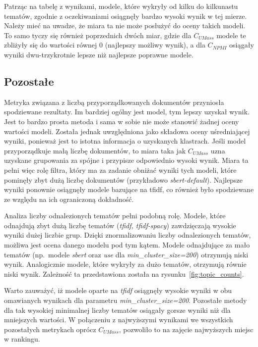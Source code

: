		Patrząc na tabelę z wynikami, modele, które wykryły od kilku do kilkunastu tematów, zgodnie z oczekiwaniami osiągnęły bardzo wysoki wynik w tej mierze.
		Należy mieć na uwadze, że miara ta nie może posłużyć do oceny takich modeli.
		To samo tyczy się również poprzednich dwóch miar, gdzie dla \(C_{UMass}\) modele te zbliżyły się do wartości równej 0 (najlepszy możliwy wynik),
			a dla \(C_{NPMI}\) osiągały wyniki dwu-trzykrotnie lepsze niż najlepsze poprawne modele.

	\subsection{Pozostałe}
		Metryka związana z liczbą przyporządkowanych dokumentów przyniosła spodziewane rezultaty.
		Im bardziej ogólny jest model, tym lepszy uzyskał wynik.
		Jest to bardzo prosta metoda i sama w sobie nie może stanowić żadnej oceny wartości modeli.
		Została jednak uwzględniona jako składowa oceny uśredniającej wyniki, ponieważ jest to istotna informacja o uzyskanych klastrach.
		Jeśli model przyporządkuje małą liczbę dokumentów, to miara taka jak \(C_{UMass}\) uzna uzyskane grupowania za spójne i przypisze odpowiednio wysoki wynik.
		Miara ta pełni więc rolę filtra, który ma za zadanie obniżać wyniki tych modeli, które pominęły zbyt dużą liczbę dokumentów (przykładowo \emph{sbert-default}).
		Najlepsze wyniki ponownie osiągnęły modele bazujące na tfidf, co również było spodziewane ze względu na ich ograniczoną dokładność.

		Analiza liczby odnalezionych tematów pełni podobną rolę.
		Modele, które odnajdują zbyt dużą liczbę tematów (\emph{tfidf, tfidf-spacy}) zawdzięczają wysokie wyniki dużej liczbie grup.
		Dzięki znormalizowaniu liczby odnalezionych tematów, możliwa jest ocena danego modelu pod tym kątem.
		Modele odnajdujące za mało tematów (np.~modele \emph{sbert} oraz \emph{use} dla \emph{min\_cluster\_size=200}) otrzymują niski wynik.
		Analogicznie modele, które wykryły za dużo tematów, otrzymują równie niski wynik.
		Zależność ta przedstawiona została na rysunku~\ref{fig:topic_counts}.
		
		Warto zauważyć, iż modele oparte na \emph{tfidf} osiągnęły wysokie wyniki w obu omawianych wynikach dla parametru \emph{min\_cluster\_size=200}.
		Pozostałe metody dla tak wysokiej minimalnej liczby tematów osiągały gorsze wyniki niż dla mniejszych wartości.
		W połączeniu z najwyższymi wynikami we wszystkich pozostałych metrykach oprócz \(C_{UMass}\), pozwoliło to na zajęcie najwyższych miejsc w rankingu.